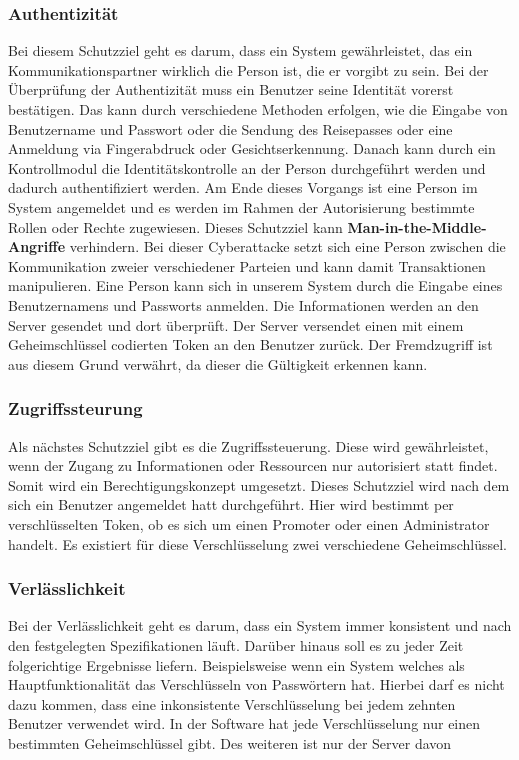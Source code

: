 \subsubsection{Authentizität}
Bei diesem Schutzziel geht es darum, dass ein System gewährleistet, das ein Kommunikationspartner wirklich die Person ist, die er vorgibt zu sein. Bei der Überprüfung der Authentizität muss ein Benutzer seine Identität vorerst bestätigen. Das kann durch verschiedene Methoden erfolgen, wie die Eingabe von Benutzername und Passwort oder die Sendung des Reisepasses oder eine Anmeldung via Fingerabdruck oder Gesichtserkennung. Danach kann durch ein Kontrollmodul die Identitätskontrolle an der Person durchgeführt werden und dadurch authentifiziert werden. Am Ende dieses Vorgangs ist eine Person im System angemeldet und es werden im Rahmen der Autorisierung bestimmte Rollen oder Rechte zugewiesen.
Dieses Schutzziel kann \textbf{Man-in-the-Middle-Angriffe} verhindern. Bei dieser Cyberattacke setzt sich eine Person zwischen die Kommunikation zweier verschiedener Parteien und kann damit Transaktionen manipulieren. 
Eine Person kann sich in unserem System durch die Eingabe eines Benutzernamens und Passworts anmelden. Die Informationen werden an den Server gesendet und dort überprüft. Der Server versendet einen mit einem Geheimschlüssel codierten Token an den Benutzer zurück. Der Fremdzugriff ist aus diesem Grund verwährt, da dieser die Gültigkeit erkennen kann.

\subsubsection{Zugriffssteurung}
Als nächstes Schutzziel gibt es die Zugriffssteuerung. Diese wird gewährleistet, wenn der Zugang zu Informationen oder Ressourcen nur autorisiert statt findet. Somit wird ein Berechtigungskonzept umgesetzt. 
Dieses Schutzziel wird nach dem sich ein Benutzer angemeldet hatt durchgeführt. Hier wird bestimmt per verschlüsselten Token, ob es sich um einen Promoter oder einen Administrator handelt. Es existiert für diese Verschlüsselung zwei verschiedene Geheimschlüssel.

\subsubsection{Verlässlichkeit}
Bei der Verlässlichkeit geht es darum, dass ein System immer konsistent und nach den festgelegten Spezifikationen läuft. Darüber hinaus soll es zu jeder Zeit folgerichtige Ergebnisse liefern. Beispielsweise wenn ein System welches als Hauptfunktionalität das Verschlüsseln von Passwörtern hat. Hierbei darf es nicht dazu kommen, dass eine inkonsistente Verschlüsselung bei jedem zehnten Benutzer verwendet wird.
In der Software hat jede Verschlüsselung nur einen bestimmten Geheimschlüssel gibt. Des weiteren ist nur der Server davon 

